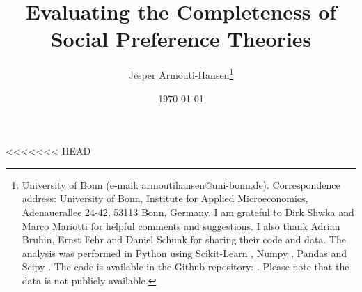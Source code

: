 \documentclass[11pt,a4paper]{article}
\theoremstyle{definition}
\begin{document}
\title{\vspace{-2cm}\large \textbf{Evaluating the Completeness of Social Preference Theories}}
<<<<<<< HEAD
\author{Jesper Armouti-Hansen\thanks{University of Bonn (e-mail: armoutihansen@uni-bonn.de). Correspondence address: University of Bonn, Institute for Applied Microeconomics, Adenauerallee 24-42, 53113 Bonn, Germany. I am grateful to Dirk Sliwka and Marco Mariotti for helpful comments and suggestions. I also thank Adrian Bruhin, Ernst Fehr and Daniel Schunk for sharing their code and data. The analysis was performed in Python using Scikit-Learn \citep{Pedregosa2011}, Numpy \citep{Harris2020}, Pandas \citep{Mckinney2010} and Scipy \citep{Virtanen2020}. The code is available in the Github repository: . Please note that the data is not publicly available.}}
\date{\today}
\maketitle
\end{document}

